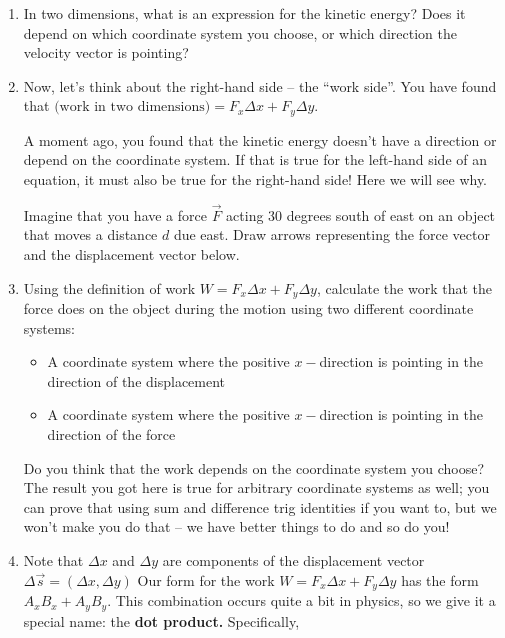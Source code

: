 \documentclass[12pt]{article}
\begin{document}
\begin{enumerate}
\vspace{1.5in}

\item In two dimensions, what is an expression for the kinetic energy? Does it depend on which coordinate system you choose, or which direction the velocity vector is pointing?

\newpage

\item Now, let's think about the right-hand side -- the ``work side''. You have found that 
$\text{(work in two dimensions)} = F_x \Delta x + F_y \Delta y.$

A moment ago, you found that the kinetic energy doesn't have a direction or depend on the coordinate system. If that is true for the left-hand side of an equation, it must also be true for the right-hand side! Here we will see why.

Imagine that you have a force $\vec F$ acting 30 degrees south of east on an object that moves a distance $d$ due east. Draw arrows representing the force vector and the displacement vector below.
\vspace{1in}


\item Using the definition of work $W = F_x \Delta x + F_y \Delta y$, calculate the work that the force does on the object during the motion using two different coordinate systems:

\begin{itemize}
\item A coordinate system where the positive $x-$direction is pointing in the direction of the displacement

\item A coordinate system where the positive $x-$direction is pointing in the direction of the force
\end{itemize}

Do you think that the work depends on the coordinate system you choose? The result you got here is true for arbitrary coordinate systems as well; you can prove that using sum and difference trig identities if you want to, but we won't make you do that -- we have better things to do and so do you!

\newpage

\item Note that $\Delta x$ and $\Delta y$ are components of the displacement vector $\Delta \vec s = (\Delta x, \Delta y)$ Our form for the work $W = F_x \Delta x + F_y \Delta y$ has the form $A_x B_x + A_y B_y$. This combination occurs quite a bit in physics, so we give it a special name: the {\bf dot product.} Specifically,


\end{enumerate}
\end{document}
